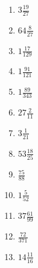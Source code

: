 \documentclass[12pt]{article}
\begin{document}
\begin{enumerate}
\item $ 3 \frac{19}{27} $
\item $ 64 \frac{8}{27} $
\item $ 1 \frac{17}{129} $
\item $ 1 \frac{91}{121} $
\item $ 1 \frac{89}{343} $
\item $ 27 \frac{2}{11} $
\item $ 3 \frac{1}{21} $
\item $ 53 \frac{18}{25} $
\item $ \frac{75}{88} $
\item $ 1 \frac{5}{52} $
\item $ 37 \frac{61}{99} $
\item $ \frac{72}{371} $
\item $ 14 \frac{11}{16} $
\end{enumerate}
\newpage
\end{document}
